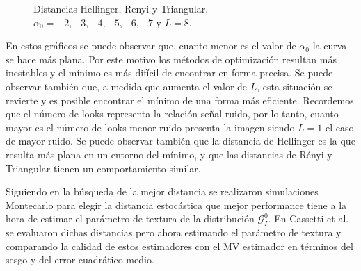 \begin{figure}[h!]
	\centering    
	\caption{\label{DistL8}\small Distancias Hellinger, Renyi y Triangular, $\alpha_0= -2,-3,-4,-5,-6,-7$ y $L=8$.}
\end{figure}

En estos gráficos se puede observar que, cuanto menor es el valor de $\alpha_0$ la curva se hace más plana. Por este motivo los métodos de optimización resultan más inestables y el mínimo es más difícil de encontrar en forma precisa. Se puede observar también que, a medida que aumenta el valor de $L$, esta situación se revierte y es posible encontrar el mínimo de una forma más eficiente. Recordemos que el número de looks representa la relación señal ruido, por lo tanto, cuanto mayor es el número de looks menor ruido presenta la imagen siendo $L=1$ el caso de mayor ruido. Se puede observar también que la distancia de Hellinger es la que resulta más plana en un entorno del mínimo, y que las distancias de Rényi y Triangular tienen un comportamiento similar.

Siguiendo en la búsqueda de la mejor distancia se realizaron simulaciones Montecarlo para elegir la distancia estocástica que mejor performance tiene a la hora de estimar el parámetro de textura de la distribución $\mathcal{G}_I^0$. En Cassetti et al.~\cite{cassettiast2013} se evaluaron dichas distancias pero ahora estimando el parámetro de textura y  comparando la calidad de estos estimadores con el MV estimador en términos del sesgo y del error cuadrático medio. 

